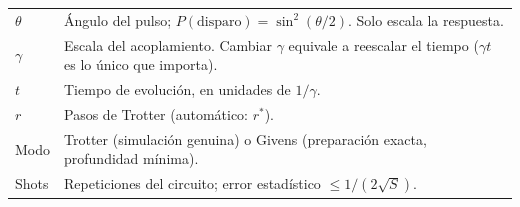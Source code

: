 \documentclass[11pt,a4paper]{article}
\theoremstyle{plain}
\theoremstyle{definition}
\theoremstyle{remark}
\begin{document}
\begin{center}
\renewcommand{\arraystretch}{1.15}
\begin{tabular}{@{}lL{0.72\textwidth}@{}}
\toprule
$\theta$ & Ángulo del pulso; $P(\text{disparo})=\sin^2(\theta/2)$. Solo escala la respuesta.\\
$\gamma$ & Escala del acoplamiento. Cambiar $\gamma$ equivale a reescalar el tiempo ($\gamma t$ es lo único que importa).\\
$t$ & Tiempo de evolución, en unidades de $1/\gamma$.\\
$r$ & Pasos de Trotter (automático: $r^*$).\\
Modo & Trotter (simulación genuina) o Givens (preparación exacta, profundidad mínima).\\
Shots & Repeticiones del circuito; error estadístico $\le1/(2\sqrt S)$.\\
\bottomrule
\end{tabular}
\end{center}
\end{document}

